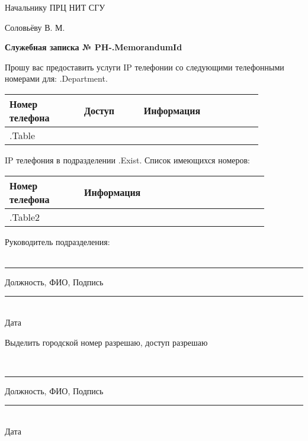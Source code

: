 \documentclass[12pt]{article}
\begin{document}
\begin{flushright}
Начальнику ПРЦ НИТ СГУ

Соловьёву В. М. \\[50pt]
\end{flushright}

\begin{center}
\large
\textbf{Служебная записка № PH-{{.MemorandumId}} } \\[20pt]
\end{center}
\begin{flushleft}
\large
Прошу вас предоставить услуги IP телефонии со следующими телефонными номерами для: {{.Department}}.
\end{flushleft}




\begin{table}[!h]
\large
\centering
\label{my-label}
\begin{tabular}{|p{0.25\linewidth}|p{0.20\linewidth}|p{0.40\linewidth}|}
\hline
Номер телефона & Доступ & Информация \\
\hline
{{.Table}}
\end{tabular}
\end{table}

IP телефония в подразделении {{.Exist}}. Список имеющихся номеров:

\begin{table}[!h]
\large
\centering
\label{my-label}
\begin{tabular}{|p{0.25\linewidth}|p{0.62\linewidth}|}
\hline
Номер телефона & Информация \\
\hline
{{.Table2}}
\end{tabular}
\end{table}


\normalsize
\begin{flushleft}
\large
Руководитель подразделения:\\~\\
\end{flushleft}
\centering
\noindent\rule{550pt}{0.4pt}
\large
Должность, ФИО, Подпись\\[50pt]

\begin{flushright}
\normalsize
\noindent\rule{100pt}{0.4pt} \\
Дата           
\end{flushright}

\begin{flushleft}
Выделить городской номер разрешаю, доступ разрешаю
\end{flushleft}
 
\\

\centering
\noindent\rule{550pt}{0.4pt}
\large
Должность, ФИО, Подпись\\[50pt]

\begin{flushright}
\normalsize
\noindent\rule{100pt}{0.4pt} \\
Дата           
\end{flushright}
\end{document}
